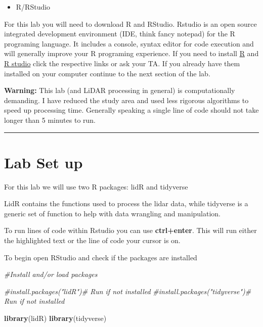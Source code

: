 \documentclass[
]{book}
\newenvironment{Shaded}{\begin{snugshade}}{\end{snugshade}}
\newcommand{\CommentTok}[1]{\textcolor[rgb]{0.56,0.35,0.01}{\textit{#1}}}
\newcommand{\FunctionTok}[1]{\textcolor[rgb]{0.13,0.29,0.53}{\textbf{#1}}}
\newcommand{\NormalTok}[1]{#1}
\providecommand{\tightlist}{%
  \setlength{\itemsep}{0pt}\setlength{\parskip}{0pt}}
\begin{document}
\begin{itemize}
\tightlist
\item
  R/RStudio
\end{itemize}

For this lab you will need to download R and RStudio. Rstudio is an open source integrated development environment (IDE, think fancy notepad) for the R programing language. It includes a console, syntax editor for code execution and will generally improve your R programing experience. If you need to install \href{https://cran.rstudio.com/}{R} and \href{https://posit.co/download/rstudio-desktop/}{R studio} click the respective links or ask your TA. If you already have them installed on your computer continue to the next section of the lab.

\textbf{Warning:} This lab (and LiDAR processing in general) is computationally demanding. I have reduced the study area and used less rigorous algorithms to speed up processing time. Generally speaking a single line of code should not take longer than 5 minutes to run.

\begin{center}\rule{0.5\linewidth}{0.5pt}\end{center}

\hypertarget{lab-set-up}{%
\section*{Lab Set up}\label{lab-set-up}}

For this lab we will use two R packages: lidR and tidyverse

LidR contains the functions used to process the lidar data, while tidyverse is a generic set of function to help with data wrangling and manipulation.

To run lines of code within Rstudio you can use \textbf{ctrl+enter}. This will run either the highlighted text or the line of code your cursor is on.

To begin open RStudio and check if the packages are installed

\begin{Shaded}
\begin{Highlighting}[]
\CommentTok{\#Install and/or load packages }

\CommentTok{\#install.packages("lidR")\# Run if not installed }
\CommentTok{\#install.packages("tidyverse")\# Run if not installed}

\FunctionTok{library}\NormalTok{(lidR)}
\FunctionTok{library}\NormalTok{(tidyverse)}
\end{Highlighting}
\end{Shaded}
\end{document}
